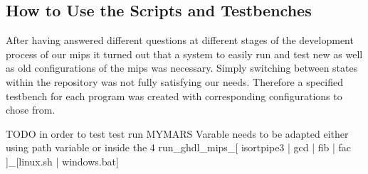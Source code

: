 
\subsection{How to Use the Scripts and Testbenches}
\label{sec:howToUseScripts}

After having answered different questions at different stages of the development process of our mips it turned out that a system to easily run and test new as well as old configurations of the mips was necessary. Simply switching between states within the repository was not fully satisfying our needs. Therefore a specified testbench for each program was created with corresponding configurations to chose from.



TODO in order to test test run MYMARS Varable needs to be adapted either using path variable or inside the 4 run_ghdl_mips_[ isortpipe3 | gcd | fib | fac ]_[linux.sh | windows.bat]

